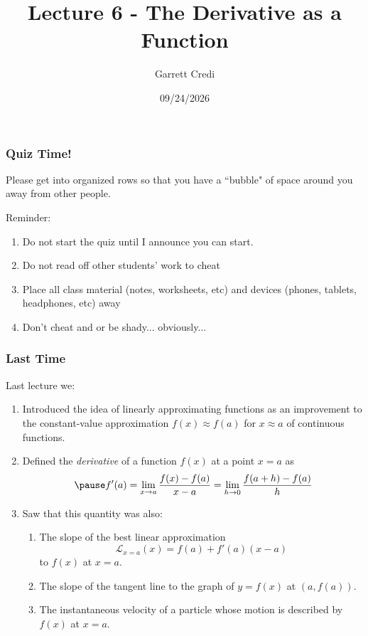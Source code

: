 \documentclass{ltx-talk}
\title{Lecture 6 - The Derivative as a Function}
\author{Garrett Credi}
\date{09/24/2026}
\begin{document}
\begin{frame}
  \maketitle
\end{frame}

\begin{frame}
  \frametitle{Quiz Time!}

  Please get into organized rows so that you have a ``bubble" of space around you
  away from other people.

  Reminder:
  \begin{enumerate}
    \item Do not start the quiz until I announce you can start.
    \item Do not read off other students' work to cheat
    \item Place all class material (notes, worksheets, etc) and devices (phones, tablets, headphones, etc) away
    \item Don't cheat and or be shady... obviously...
  \end{enumerate}
\end{frame}

\begin{frame}
  \frametitle{Last Time}

  Last lecture we: \pause
  \begin{enumerate}
    \item Introduced the idea of linearly approximating functions as an improvement to the constant-value approximation $f(x) \approx f(a)$ for $x \approx a$
      of continuous functions. \pause
    \item Defined the \textit{derivative} of a function $f(x)$ at a point $x = a$ as 
      \begin{equation} \pause
        f'(a) = \lim\limits_{x \rightarrow a} \dfrac{f(x) - f(a)}{x - a} = \lim\limits_{h \rightarrow 0} \dfrac{f(a + h) - f(a)}{h}
      \end{equation} \pause
    \item Saw that this quantity was also: \pause
      \begin{enumerate}
        \item The slope of the best linear approximation 
          \begin{equation}
            \mathscr{L}_{x = a}(x) = f(a) + f'(a)(x - a)
          \end{equation}
          to $f(x)$ at $x = a$. \pause
        \item The slope of the tangent line to the graph of $y = f(x)$ at $(a, f(a))$. \pause
        \item The instantaneous velocity of a particle whose motion is described by $f(x)$ at $x = a$.
      \end{enumerate}
  \end{enumerate}
\end{frame}
\end{document}
